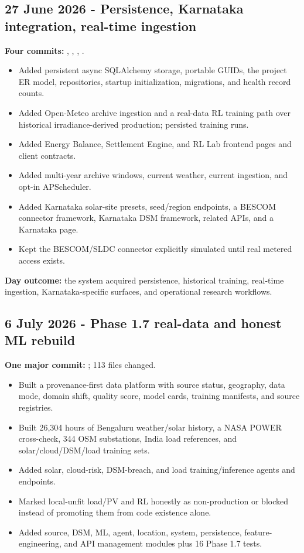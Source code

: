 \documentclass[10pt,a4paper]{article}
\begin{document}
\subsection{27 June 2026 - Persistence, Karnataka integration, real-time ingestion}

\textbf{Four commits:} , , , .

\begin{itemize}
  \item Added persistent async SQLAlchemy storage, portable GUIDs, the project ER model,
        repositories, startup initialization, migrations, and health record counts.
  \item Added Open-Meteo archive ingestion and a real-data RL training path over historical
        irradiance-derived production; persisted training runs.
  \item Added Energy Balance, Settlement Engine, and RL Lab frontend pages and client contracts.
  \item Added multi-year archive windows, current weather, current ingestion, and opt-in APScheduler.
  \item Added Karnataka solar-site presets, seed/region endpoints, a BESCOM connector framework,
        Karnataka DSM framework, related APIs, and a Karnataka page.
  \item Kept the BESCOM/SLDC connector explicitly simulated until real metered access exists.
\end{itemize}

\textbf{Day outcome:} the system acquired persistence, historical training, real-time ingestion,
Karnataka-specific surfaces, and operational research workflows.

\subsection{6 July 2026 - Phase 1.7 real-data and honest ML rebuild}

\textbf{One major commit:} ; 113 files changed.

\begin{itemize}
  \item Built a provenance-first data platform with source status, geography, data mode, domain
        shift, quality score, model cards, training manifests, and source registries.
  \item Built 26,304 hours of Bengaluru weather/solar history, a NASA POWER cross-check, 344 OSM
        substations, India load references, and solar/cloud/DSM/load training sets.
  \item Added solar, cloud-risk, DSM-breach, and load training/inference agents and endpoints.
  \item Marked local-unfit load/PV and RL honestly as non-production or blocked instead of
        promoting them from code existence alone.
  \item Added source, DSM, ML, agent, location, system, persistence, feature-engineering, and API
        management modules plus 16 Phase 1.7 tests.
\end{itemize}
\end{document}
